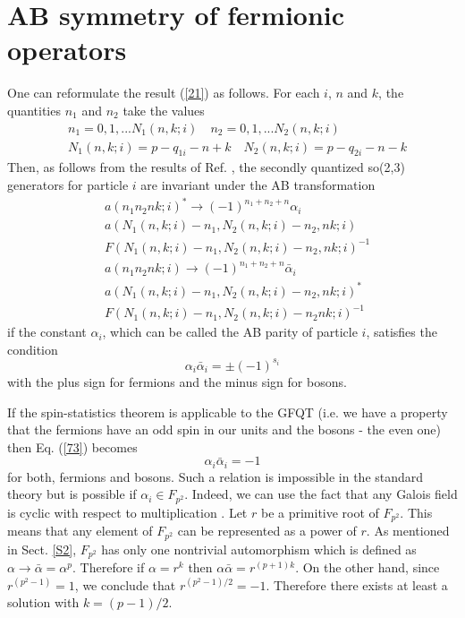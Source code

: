 \documentclass[a4paper,12pt]{article}%
\begin{document}
\section{AB symmetry of fermionic operators}
\label{S7}

One can reformulate the result (\ref{21}) as follows. 
For each $i$, $n$ and $k$, the quantities $n_1$ and $n_2$ 
take the values
\begin{eqnarray}
&n_1=0,1,...N_1(n,k;i)\quad n_2=0,1,...N_2(n,k;i)\nonumber\\
&N_1(n,k;i)=p-q_{1i}-n+k\quad N_2(n,k;i)=p-q_{2i}-n-k
\label{71}
\end{eqnarray}
Then, as follows from the results of Ref. \cite{lev3},
the secondly quantized so(2,3) generators for particle $i$ 
are invariant under the AB transformation 
\begin{eqnarray}
&a(n_1n_2nk;i)^*\rightarrow (-1)^{n_1+n_2+n}\alpha_i\nonumber\\ 
&a(N_1(n,k;i)-n_1,N_2(n,k;i)-n_2,nk;i)\nonumber\\
&F(N_1(n,k;i)-n_1,N_2(n,k;i)-n_2,nk;i)^{-1}\nonumber\\ 
&a(n_1n_2nk;i)\rightarrow (-1)^{n_1+n_2+n} 
{\bar\alpha}_i\nonumber\\
&a(N_1(n,k;i)-n_1,N_2(n,k;i)-n_2,nk;i)^*\nonumber\\
&F(N_1(n,k;i)-n_1,N_2(n,k;i)-n_2nk;i)^{-1}          
\label{72}
\end{eqnarray}
if the constant $\alpha_i$, which can be called the 
AB parity of particle $i$, satisfies the condition
\begin{equation}
\alpha_i{\bar\alpha}_i=\pm (-1)^{s_i}
\label{73}
\end{equation} 
with the plus sign for fermions and the minus sign for
bosons. 

If the spin-statistics theorem is applicable
to the GFQT (i.e. we have a property that
the fermions have an odd spin in our units and the
bosons - the even one) then Eq. (\ref{73}) becomes 
\begin{equation}
\alpha_i{\bar\alpha}_i=-1
\label{74}
\end{equation}
for both, fermions and bosons. Such a relation is
impossible in the standard theory but is possible
if $\alpha_i\in F_{p^2}$. Indeed, we can use 
the fact that any Galois field is 
cyclic with respect to multiplication \cite{VDW}. 
Let $r$ be a primitive root of $F_{p^2}$. This means that any
element of $F_{p^2}$ can be represented as a power of $r$. 
As mentioned in Sect. \ref{S2}, $F_{p^2}$ has only one
nontrivial automorphism which is defined as 
$\alpha\rightarrow {\bar \alpha}=\alpha^p$. 
Therefore if $\alpha =r^k$ then $\alpha{\bar \alpha}=
r^{(p+1)k}$. On the other hand, since $r^{(p^2-1)}=1$, we
conclude that $r^{(p^2-1)/2}=-1$. Therefore there exists at
least a solution with $k=(p-1)/2$. 
\end{document}

